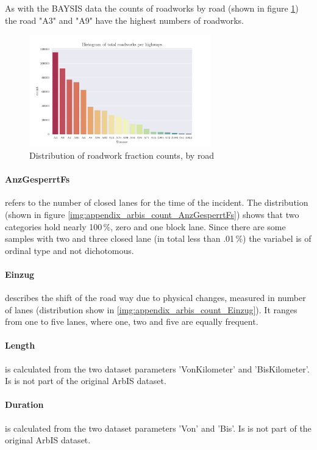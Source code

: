 \documentclass[a4paper,headsepline,footsepline,fontsize=11pt,BCOR=12mm,DIV=12]{report}
\begin{document}
As with the BAYSIS data the counts of roadworks by road (shown in figure \ref{img:arbis_dataset_dist_highway}) the road "A3" and "A9" have the highest numbers of roadworks.

\begin{figure}[h]
	\centering
	\includegraphics[width=0.7\textwidth]{../CorrAnalysis/data/ArbIS/01_dataset/plots/arbis_dataset_hist_highway}
	\caption{Distribution of roadwork fraction counts, by road}
	\label{img:arbis_dataset_dist_highway}
\end{figure}

\paragraph{AnzGesperrtFs} refers to the number of closed lanes for the time of the incident. The distribution (shown in figure \ref{img:appendix_arbis_count_AnzGesperrtFs}) shows that two categories hold nearly 100\,\%, zero and one block lane. Since there are some samples with two and three closed lane (in total less than .01\,\%) the variabel is of ordinal type and not dichotomous.

\paragraph{Einzug} describes the shift of the road way due to physical changes, measured in number of lanes (distribution show in \ref{img:appendix_arbis_count_Einzug}). It ranges from one to five lanes, where one, two and five are equally frequent. 

\paragraph{Length} is calculated from the two dataset parameters 'VonKilometer' and 'BisKilometer'. Is is not part of the original ArbIS dataset.

\paragraph{Duration} is calculated from the two dataset parameters 'Von' and 'Bis'. Is is not part of the original ArbIS dataset.
\end{document}
